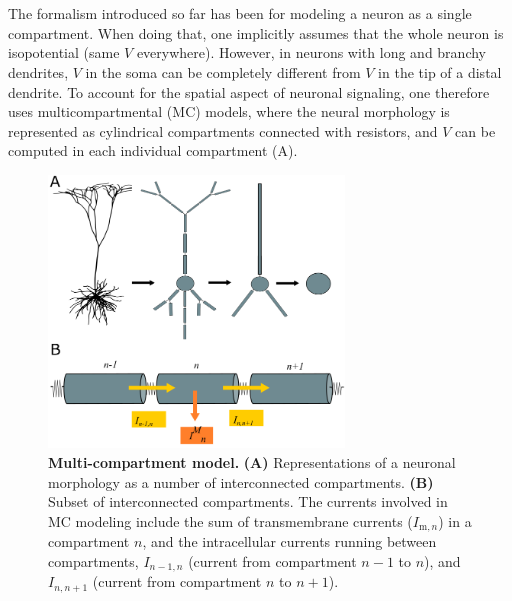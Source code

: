 \section{}
\label{sec:Neuron:morphology}
The formalism introduced so far has been for modeling a neuron as a single compartment. When doing that, one implicitly assumes that the whole neuron is isopotential (same $V$ everywhere). However, in neurons with long and branchy dendrites, $V$ in the soma can be completely different from $V$ in the tip of a distal dendrite. To account for the spatial aspect of neuronal signaling, one therefore uses multicompartmental (MC) models, where the neural morphology is represented as cylindrical compartments connected with resistors, and $V$ can be computed in each individual compartment (A). 

\begin{figure}[!ht]
\begin{center}
\includegraphics[width=0.7\textwidth]{Figures/Neuron/multikompis.png}
\end{center}
\caption{\textbf{Multi-compartment model.} {\bf (A)} Representations of a neuronal morphology as a number of interconnected compartments. {\bf (B)} Subset of interconnected compartments. The currents involved in MC modeling include the sum of transmembrane currents ($I_{\mathrm{m},n}$) in a compartment $n$, and the intracellular currents running between 
compartments, $I_{n-1,n}$ (current from compartment $n-1$ to $n$), and $I_{n,n+1}$ (current from compartment $n$ to $n+1$).
}

\label{fig:Neuron:multikompisen}
\end{figure}

